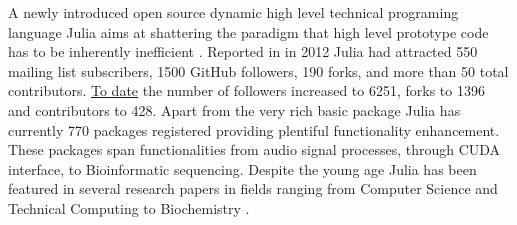 A newly introduced open source dynamic high level technical programing language Julia aims at shattering the paradigm that high level prototype code has to be inherently inefficient \cite{bezanson2012julia, bezanson2014julia}. Reported in \cite{bezanson2012julia} in 2012 Julia had attracted 550 mailing list subscribers, 1500 GitHub followers, 190 forks, and more than 50 total contributors. \href{https://github.com/JuliaLang/julia}{To date} the number of followers increased to 6251, forks to 1396 and contributors to 428. Apart from the very rich basic package Julia has currently 770 packages registered providing plentiful functionality enhancement. These packages span functionalities from audio signal processes, through CUDA interface, to Bioinformatic sequencing. Despite the young age Julia has been featured in several research papers in fields ranging from Computer Science and Technical Computing \cite{Heitzinger_2014, Knopp_2014, Foulds_2013} to Biochemistry \cite{Baldassi_2014}.

